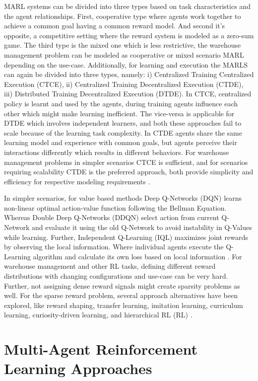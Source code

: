 \documentclass{article}
\begin{document}
MARL systems can be divided into three types based on task characteristics and the agent relationships.
First, cooperative type where agents work together to achieve a common goal having a common reward model.
And second it's opposite, a competitive setting where the reward system is modeled as a zero-sum game.
The third type is the mixed one which is less restrictive, the warehouse management problem can be modeled as cooperative or mixed scenario MARL depending on the use-case.
Additionally, for learning and execution the MARLS can again be divided into three types, namely: i) Centralized Training Centralized Execution (CTCE), ii) Centralized Training Decentralized Execution (CTDE), iii) Distributed Training Decentralized Execution (DTDE).
In CTCE, centralized policy is learnt and used by the agents, during training agents influence each other which might make learning inefficient.
The vice-versa is applicable for DTDE which involves independent learners, and both these approaches fail to scale because of the learning task complexity.
In CTDE agents share the same learning model and experience with common goals, but agents perceive their interactions differently which results in different behaviors.
For warehouse management problems in simpler scenarios CTCE is sufficient, and for scenarios requiring scalability CTDE is the preferred approach, both provide simplicity and efficiency for respective modeling requirements \cite{wen2021dtde}.


In simpler scenarios, for value based methods Deep Q-Networks (DQN) learns non-linear optimal action-value function following the Bellman Equation.
Whereas Double Deep Q-Networks (DDQN) select action from current Q-Network and evaluate it using the old Q-Network to avoid instability in Q-Values while learning.
Further, Independent Q-Learning (IQL) maximizes joint rewards by observing the local information.
Where individual agents execute the Q-Learning algorithm and calculate its own loss based on local information \cite{sutton2018reinforcement, wen2021dtde}.
For warehouse management and other RL tasks, defining different reward distributions with changing configurations and use-case can be very hard.
Further, not assigning dense reward signals might create sparsity problems as well.
For the sparse reward problem, several approach alternatives have been explored, like reward shaping, transfer learning, imitation learning, curriculum learning, curiosity-driven learning, and hierarchical RL (RL) \cite{huang2020action}.


\section{Multi-Agent Reinforcement Learning Approaches}
\end{document}
